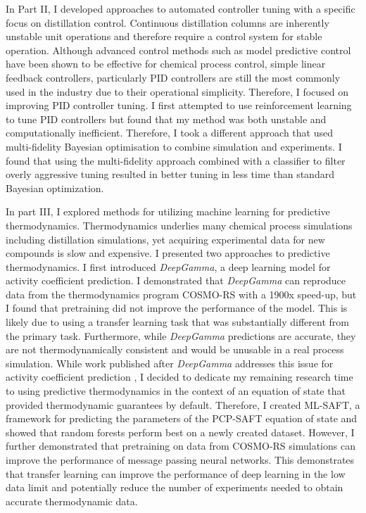 In Part II, I developed approaches to automated controller tuning with a specific focus on distillation control. Continuous distillation columns are inherently unstable unit operations and therefore require a control system for stable operation. Although advanced control methods such as model predictive control have been shown to be effective for chemical process control, simple linear feedback controllers, particularly PID controllers are still the most commonly used in the industry due to their operational simplicity. Therefore, I focused on improving PID controller tuning. I first attempted to use reinforcement learning to tune PID controllers but found that my method was both unstable and computationally inefficient. Therefore, I took a different approach that used multi-fidelity Bayesian optimisation to combine simulation and experiments.  I found that using the multi-fidelity approach combined with a classifier to filter overly aggressive tuning resulted in better tuning in less time than standard Bayesian optimization.


In part III, I explored methods for utilizing machine learning for predictive thermodynamics. Thermodynamics underlies many chemical process simulations including distillation simulations, yet acquiring experimental  data for new compounds is slow and expensive. I presented two approaches to predictive thermodynamics.  I first introduced \textit{DeepGamma}, a deep learning model for activity coefficient prediction. I demonstrated that \textit{DeepGamma} can reproduce data from the thermodynamics program COSMO-RS with a 1900x speed-up, but I found that pretraining  did not improve the performance of the model. This is likely due to using a transfer learning task that was substantially different from the primary task. Furthermore, while \textit{DeepGamma} predictions are accurate, they are not thermodynamically consistent and would be unusable in a real process simulation. While work published after \textit{DeepGamma} addresses this issue for activity coefficient prediction \cite{Winter2022, SanchezMedina2022}, I decided to dedicate my remaining research time to using predictive thermodynamics in the context of an equation of state that provided thermodynamic guarantees by default. Therefore, I created ML-SAFT, a framework for predicting the parameters of the PCP-SAFT equation of state and showed that random forests perform best on a newly created dataset. However, I further demonstrated that pretraining on data from COSMO-RS simulations can improve the performance of message passing neural networks. This demonstrates that transfer learning can improve the performance of deep learning in the low data limit and potentially reduce the number of experiments needed to obtain accurate thermodynamic data.

